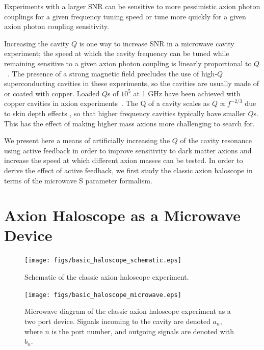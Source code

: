 \documentclass[aps,prl,twocolumn,groupedaddress]{revtex4-1}
\begin{document}
Experiments with a larger SNR can be sensitive to more pessimistic axion photon couplings for a given frequency tuning speed or tune more quickly for a given axion photon coupling sensitivity.

Increasing the cavity $Q$ is one way to increase SNR in a microwave cavity experiment; the speed at which the cavity frequency can be tuned while remaining sensitive to a given axion photon coupling is linearly proportional to $Q$~\cite{Peng2000569}.
The presence of a strong magnetic field precludes the use of high-$Q$ superconducting cavities in these experiments, so the cavities are usually made of or coated with copper.
Loaded $Q$s of $10^5$ at 1 GHz have been achieved with copper cavities in axion experiments~\cite{Peng2000569}.  The Q of a cavity scales as $Q \propto f^{-2/3}$ due to skin depth effects \cite{TODOCITETHIS}, so that higher frequency cavities typically have smaller $Q$s.  This has the effect of making higher mass axions more challenging to search for.

We present here a means of artificially increasing the $Q$ of the cavity resonance using active feedback in order to improve sensitivity to dark matter axions and increase the speed at which different axion masses can be tested.  In order to derive the effect of active feedback, we first study the classic axion haloscope in terms of the microwave S parameter formalism.

\section{Axion Haloscope as a Microwave Device}


\begin{figure}
\texttt{[image: figs/basic\_haloscope\_schematic.eps]}
\caption{\label{fig:haloscope_schematic} Schematic of the classic axion haloscope experiment.}
\texttt{[image: figs/basic\_haloscope\_microwave.eps]}
\caption{\label{fig:haloscope_equiv} Microwave diagram of the classic axion haloscope experiment as a two port device.  Signals incoming to the cavity are denoted $a_n$, where $n$ is the port number, and outgoing signals are denoted with $b_n$.}
\end{figure}
\end{document}
